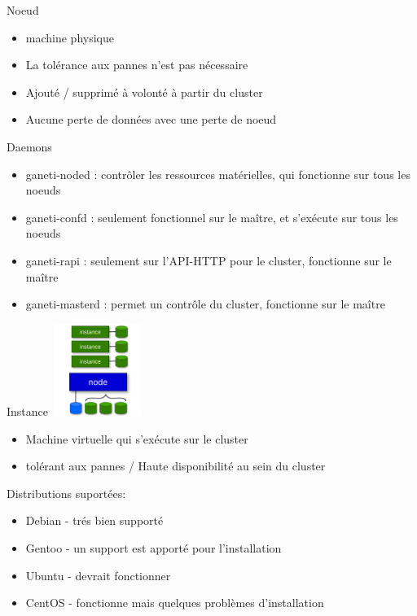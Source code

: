 \begin{frame}{Noeud}
\begin{itemize}
\item machine physique
\pause
\item La tolérance aux pannes n'est pas nécessaire
\pause
\item Ajouté / supprimé à volonté à partir du cluster
\pause
\item Aucune perte de données avec une perte de noeud
\end{itemize}
\end{frame}

\begin{frame}{Daemons}
\begin{itemize}
\item ganeti-noded : contrôler les ressources matérielles, qui fonctionne sur tous les noeuds
\pause
\item ganeti-confd : seulement fonctionnel sur le maître, et s'exécute sur tous les noeuds
\pause
\item ganeti-rapi : seulement sur l'API-HTTP  pour le cluster, fonctionne sur le maître
\pause
\item ganeti-masterd :  permet un contrôle du cluster, fonctionne sur le maître
\end{itemize}
\end{frame}

\begin{frame}{Instance}
\includegraphics[width=3cm,height=3cm]{images_presentation/instance.png}
\begin{itemize}
\item Machine virtuelle qui s'exécute sur le cluster
\pause
\item tolérant aux pannes / Haute disponibilité au sein du cluster
\end{itemize}
\end{frame}

\begin{frame}
Distributions suportées:\\
\begin{itemize}
\item Debian - trés bien supporté
\pause
\item Gentoo - un support est apporté pour l'installation
\pause
\item Ubuntu - devrait fonctionner
\pause
\item CentOS - fonctionne mais quelques problèmes d'installation
\end{itemize}
\end{frame}

